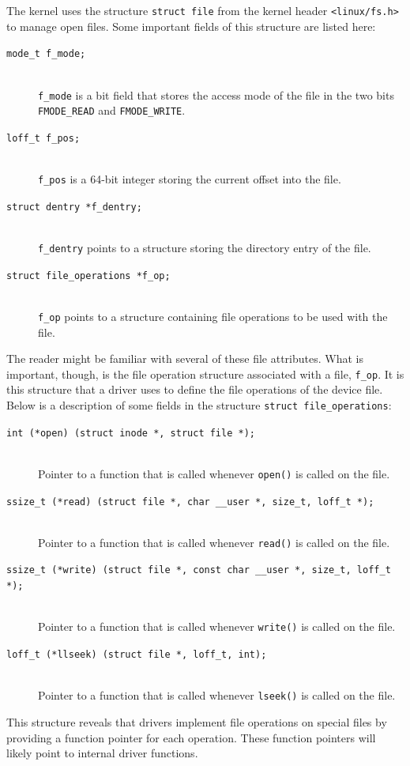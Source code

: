 The kernel uses the structure \texttt{struct file} from the kernel header \texttt{<linux/fs.h>} to manage open files. Some important fields of this structure are listed here:
\begin{description}
  \item[\texttt{mode\_t f\_mode;}] \hfill \\
    \texttt{f\_mode} is a bit field that stores the access mode of the file in the two bits \texttt{FMODE\_READ} and \texttt{FMODE\_WRITE}.
  \item[\texttt{loff\_t f\_pos;}] \hfill \\
    \texttt{f\_pos} is a 64-bit integer storing the current offset into the file.
  \item[\texttt{struct dentry *f\_dentry;}] \hfill \\
    \texttt{f\_dentry} points to a structure storing the directory entry of the file.   
  \item[\texttt{struct file\_operations *f\_op;}] \hfill \\
    \texttt{f\_op} points to a structure containing file operations to be used with the file.
\end{description}
The reader might be familiar with several of these file attributes. What is important, though, is the file operation structure associated with a file, \texttt{f\_op}. It is this structure that a driver uses to define the file operations of the device file. Below is a description of some fields in the structure \texttt{struct file\_operations}:
\begin{description}
  \item[\texttt{int (*open) (struct inode *, struct file *);}] \hfill \\
    Pointer to a function that is called whenever \texttt{open()} is called on the file.
  \item[\texttt{ssize\_t (*read) (struct file *, char \_\_user *, size\_t, loff\_t *);}] \hfill \\
    Pointer to a function that is called whenever \texttt{read()} is called on the file.
  \item[\texttt{ssize\_t (*write) (struct file *, const char \_\_user *, size\_t, loff\_t *);}] \hfill \\
    Pointer to a function that is called whenever \texttt{write()} is called on the file.
  \item[\texttt{loff\_t (*llseek) (struct file *, loff\_t, int);}] \hfill \\
    Pointer to a function that is called whenever \texttt{lseek()} is called on the file.
\end{description}
This structure reveals that drivers implement file operations on special files by providing a function pointer for each operation. These function pointers will likely point to internal driver functions.

